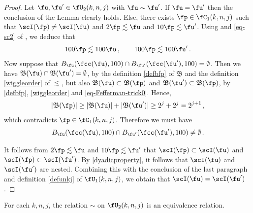 \begin{proof}
    \leanok
    Let $\fu, \fu' \in \fU_2(k,n,j)$ with $\fu \sim \fu'$. If $\fu = \fu'$ then the conclusion of the Lemma clearly holds. Else, there exists $\fp \in \fC_1(k,n,j)$ such that $\scI(\fp) \ne \scI(\fu)$ and $2 \fp \lesssim \fu$ and $10 \fp \lesssim \fu'$.
    Using  and \eqref{eq-sc2} of , we deduce that
    \begin{equation}
        \label{eq-Fefferman-trick0}
        100 \fp\lesssim 100 \fu\,, \qquad 100 \fp \lesssim 100\fu'\,.
    \end{equation}
    Now suppose that $B_{\fu}(\fcc(\fu), 100) \cap B_{\fu'}(\fcc(\fu'), 100) = \emptyset$. Then we have $\mathfrak{B}(\fu) \cap \mathfrak{B}(\fu') = \emptyset$, by the definition \eqref{defbfp} of $\mathfrak{B}$ and the definition \eqref{wiggleorder} of $\lesssim$, but also $\mathfrak{B}(\fu) \subset \mathfrak{B}(\fp)$ and $\mathfrak{B}(\fu') \subset \mathfrak{B}(\fp)$, by \eqref{defbfp}, \eqref{wiggleorder} and \eqref{eq-Fefferman-trick0}.
    Hence,
    $$
        |\mathfrak{B}(\fp)| \geq |\mathfrak{B}(\fu)| + |\mathfrak{B}(\fu')| \geq 2^{j} + 2^j = 2^{j+1}\,,
    $$
    which contradicts $\fp \in \fC_1(k,n,j)$. Therefore we must have
    \begin{equation*}
        B_{\fu}(\fcc(\fu), 100) \cap B_{\fu'}(\fcc(\fu'), 100) \ne \emptyset\, .
    \end{equation*}

    It follows from $2\fp \lesssim \fu$ and $10\fp \lesssim \fu'$ that $\scI(\fp) \subset \scI(\fu)$ and $\scI(\fp) \subset \scI(\fu')$. By \eqref{dyadicproperty}, it follows that $\scI(\fu)$ and $\scI(\fu')$ are nested.
    Combining this with the conclusion of the last paragraph and definition \eqref{defunkj} of $\fU_1(k,n,j)$, we obtain that $\scI(\fu) = \scI(\fu')$.
\end{proof}


\begin{lemma}
\label{equivalence-relation}
\leanok
{}
For each $k,n,j$, the relation $\sim$ on
$\fU_2(k,n,j)$ is an equivalence relation.
\end{lemma}

